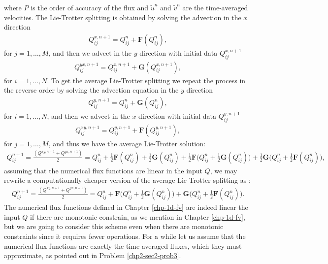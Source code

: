 where $P$ is the order of accuracy of the flux and $\tilde{u}^n$ and $\tilde{v}^n$ are the time-averaged velocities.
The Lie-Trotter splitting is obtained by solving the advection in the $x$ direction
\begin{align*}
	{Q}_{ij}^{x,n+1} =  {Q}_{ij}^{n} + \mathbf{F}({Q_{ij}^n}),
\end{align*}
for $j=1, \ldots, M$, and then we advect in the $y$ direction with initial data ${Q}_{ij}^{x,n+1}$ 
\begin{align*}
	{Q}_{ij}^{yx,n+1} = Q_{ij}^{x,n+1} + \mathbf{G}({Q_{ij}^{x,n+1}}),
\end{align*}
for $i=1, \ldots, N$.
To get the average Lie-Trotter splitting we repeat the process in the reverse order by solving the advection equation
in the $y$ direction
\begin{align*}
	{Q}_{ij}^{y,n+1} =  {Q}_{ij}^{n} + \mathbf{G}({Q_{ij}^n}),
\end{align*}
for $i=1, \ldots, N$, and then we advect in the $x$-direction with initial data ${Q}_{ij}^{y,n+1}$ 
\begin{align*}
	{Q}_{ij}^{xy,n+1} = Q_{ij}^{y,n+1} + \mathbf{F}({Q_{ij}^{y,n+1}}),
\end{align*}
for $j=1, \ldots, M$, and thus we have the average Lie-Trotter solution:
\begin{align*}
	Q^{n+1}_{ij} = \frac{(Q^{xy,n+1} + Q^{yx,n+1})}{2} = Q_{ij}^n + \frac{1}{2}\mathbf{F}(Q_{ij}^n) + \frac{1}{2}\mathbf{G}(Q_{ij}^n) + \frac{1}{2}\mathbf{F}\bigg(Q_{ij}^n + \frac{1}{2}\mathbf{G}(Q_{ij}^n)\bigg) + \frac{1}{2}\mathbf{G}\bigg(Q_{ij}^n + \frac{1}{2}\mathbf{F}(Q_{ij}^n)\bigg),
\end{align*}
assuming that the numerical flux functions are linear in the input $Q$, we may rewrite a computationally cheaper version
of the average Lie-Trotter splitting as \citep{lin:1996}:
\begin{align}
	\label{chp3-avlt}
	Q^{n+1}_{ij} = \frac{(Q^{xy,n+1} + Q^{yx,n+1})}{2} = Q_{ij}^n +  
	\mathbf{F}\bigg(Q_{ij}^n + \frac{1}{2}\mathbf{G}(Q_{ij}^n)\bigg) +  
	\mathbf{G}\bigg(Q_{ij}^n + \frac{1}{2}\mathbf{F}(Q_{ij}^n)\bigg).
\end{align}
The numerical flux functions defined in Chapter \ref{chp-1d-fv} are indeed linear the input $Q$ if there are monotonic constrain, 
as we mention in Chapter \ref{chp-1d-fv}, but we are going to consider this scheme even when there are monotonic constraints since it requires fewer operations.
For a while let us assume that the numerical flux functions are exactly the time-averaged fluxes, which they must approximate, as pointed out in Problem \ref{chp2-sec2-prob3}. 
